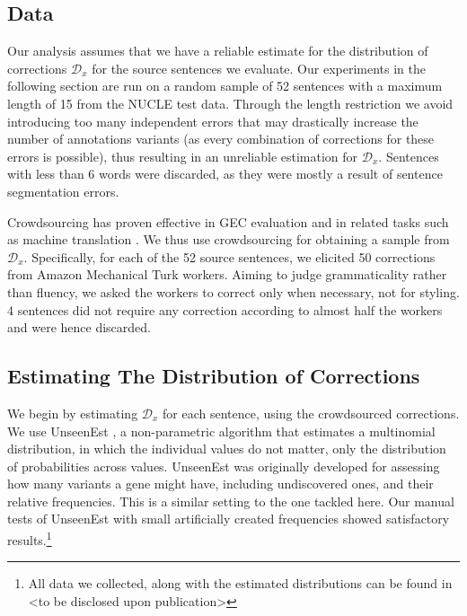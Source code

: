 \documentclass[letterpaper, 11pt]{article}
\begin{document}
 \subsection{Data}
%
Our analysis assumes that we have a reliable estimate for the distribution of corrections
$\mathcal{D}_x$ for the source sentences we evaluate.
Our experiments in the following section are run on a random sample of 52 sentences with a
maximum length of 15 from the NUCLE test data.
Through the length restriction we avoid introducing too many independent
errors that may drastically increase the number of annotations variants (as every combination of corrections for these errors is possible), thus resulting in an unreliable estimation for $\mathcal{D}_x$.
Sentences with less than 6 words were discarded, as they were mostly a result of sentence segmentation errors.

Crowdsourcing has proven effective in GEC evaluation \cite{madnani2011they,napoles2015ground} and in
related tasks such as machine translation \cite{zaidan2011crowdsourcing,post2012constructing}. We thus
use crowdsourcing for obtaining a sample from $\mathcal{D}_x$. Specifically, for each of the 52 source
sentences, we elicited 50 corrections from Amazon Mechanical Turk workers.
Aiming to judge grammaticality rather than fluency, we asked the workers to
correct only when necessary, not for styling.
4 sentences did not require any correction according to almost half the workers and were hence discarded.
%
\subsection{Estimating The Distribution of Corrections}\label{subsec:corrections_distribution}
%
We begin by estimating $\mathcal{D}_x$ for each sentence, using the crowdsourced corrections.
We use {\sc UnseenEst} \cite{zou2015quantifying}, a non-parametric algorithm that
estimates a multinomial distribution,
in which the individual values do not matter, only the distribution of probabilities
across values.%
{\sc UnseenEst} was originally developed for assessing how many
variants a gene might have, including undiscovered ones,
and their relative frequencies.
This is a similar setting to the one tackled here.
Our manual tests of {\sc UnseenEst} with small artificially created frequencies
showed satisfactory results.\footnote{All data we collected, along with the estimated
  distributions can be found in <to be disclosed upon publication>}
\end{document}
